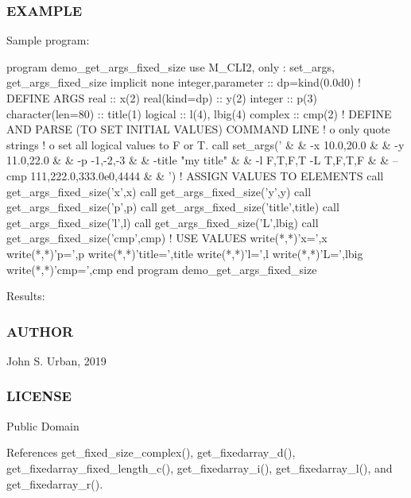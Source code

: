 \subsubsection*{E\+X\+A\+M\+P\+LE}

Sample program\+: \begin{DoxyVerb}program demo_get_args_fixed_size
use M_CLI2,  only : set_args, get_args_fixed_size
implicit none
integer,parameter   :: dp=kind(0.0d0)
! DEFINE ARGS
real                :: x(2)
real(kind=dp)       :: y(2)
integer             :: p(3)
character(len=80)   :: title(1)
logical             :: l(4), lbig(4)
complex             :: cmp(2)
! DEFINE AND PARSE (TO SET INITIAL VALUES) COMMAND LINE
!   o only quote strings
!   o set all logical values to F or T.
call set_args(' &
   & -x 10.0,20.0 &
   & -y 11.0,22.0 &
   & -p -1,-2,-3 &
   & -title "my title" &
   & -l F,T,F,T -L T,F,T,F  &
   & --cmp 111,222.0,333.0e0,4444 &
   & ')
! ASSIGN VALUES TO ELEMENTS
   call get_args_fixed_size('x',x)
   call get_args_fixed_size('y',y)
   call get_args_fixed_size('p',p)
   call get_args_fixed_size('title',title)
   call get_args_fixed_size('l',l)
   call get_args_fixed_size('L',lbig)
   call get_args_fixed_size('cmp',cmp)
! USE VALUES
   write(*,*)'x=',x
   write(*,*)'p=',p
   write(*,*)'title=',title
   write(*,*)'l=',l
   write(*,*)'L=',lbig
   write(*,*)'cmp=',cmp
end program demo_get_args_fixed_size
\end{DoxyVerb}
 Results\+:

\subsubsection*{A\+U\+T\+H\+OR}

John S. Urban, 2019 \subsubsection*{L\+I\+C\+E\+N\+SE}

Public Domain 

References get\+\_\+fixed\+\_\+size\+\_\+complex(), get\+\_\+fixedarray\+\_\+d(), get\+\_\+fixedarray\+\_\+fixed\+\_\+length\+\_\+c(), get\+\_\+fixedarray\+\_\+i(), get\+\_\+fixedarray\+\_\+l(), and get\+\_\+fixedarray\+\_\+r().

